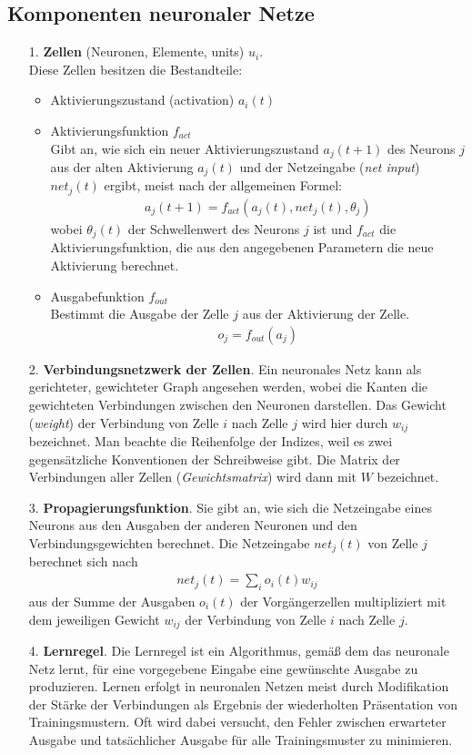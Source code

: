 \subsection*{Komponenten neuronaler Netze}
\begin{itemize}
\item[1.] \textbf{Zellen} (Neuronen, Elemente, units) $u_i$.\\ Diese Zellen besitzen die Bestandteile:
\begin{itemize}[noitemsep]
\item Aktivierungszustand (activation) $a_i(t)$
\item Aktivierungsfunktion $f_{act}$\\
Gibt an, wie sich ein neuer Aktivierungszustand $a_j(t+1)$ des Neurons $j$ aus der alten Aktivierung $a_j(t)$ und der Netzeingabe (\textit{net input}) $net_j(t)$ ergibt, meist nach der allgemeinen Formel:
\begin{align*}
a_j(t+1) = f_{act}\left(a_j(t), net_j(t), \theta_j\right)
\end{align*}
wobei $\theta_j(t)$ der Schwellenwert des Neurons $j$ ist und $f_{act}$ die
Aktivierungsfunktion, die aus den angegebenen Parametern die neue
Aktivierung berechnet.
\item Ausgabefunktion $f_{out}$\\ Bestimmt die Ausgabe der Zelle $j$ aus der Aktivierung der Zelle.
\begin{align*}
o_j = f_{out}(a_j)
\end{align*}
\end{itemize}
\item[2.] \textbf{Verbindungsnetzwerk der Zellen}. Ein neuronales Netz kann als gerichteter,
gewichteter Graph angesehen werden, wobei die Kanten die gewichteten
Verbindungen zwischen den Neuronen darstellen. Das Gewicht (\textit{weight}) der
Verbindung von Zelle $i$ nach Zelle $j$ wird hier durch $w_{ij}$ bezeichnet. Man beachte
die Reihenfolge der Indizes, weil es zwei gegensätzliche Konventionen der
Schreibweise gibt. Die Matrix der Verbindungen aller Zellen (\textit{Gewichtsmatrix})
wird dann mit $W$ bezeichnet.
\item[3.] \textbf{Propagierungsfunktion}. Sie gibt an, wie sich die Netzeingabe eines Neurons aus
den Ausgaben der anderen Neuronen und den Verbindungsgewichten berechnet.
Die Netzeingabe $net_j(t)$ von Zelle $j$ berechnet sich nach
\begin{align*}
net_j(t) = \sum\limits_i o_i(t)w_{ij}
\end{align*}
aus der Summe der Ausgaben $o_i(t)$ der Vorgängerzellen multipliziert mit dem
jeweiligen Gewicht $w_{ij}$ der Verbindung von Zelle $i$ nach Zelle $j$.
\item[4.] \textbf{Lernregel}. Die Lernregel ist ein Algorithmus, gemäß dem das neuronale Netz
lernt, für eine vorgegebene Eingabe eine gewünschte Ausgabe zu produzieren.
Lernen erfolgt in neuronalen Netzen meist durch Modifikation der Stärke der
Verbindungen als Ergebnis der wiederholten Präsentation von Trainingsmustern.
Oft wird dabei versucht, den Fehler zwischen erwarteter Ausgabe und
tatsächlicher Ausgabe für alle Trainingsmuster zu minimieren. 
\end{itemize}
